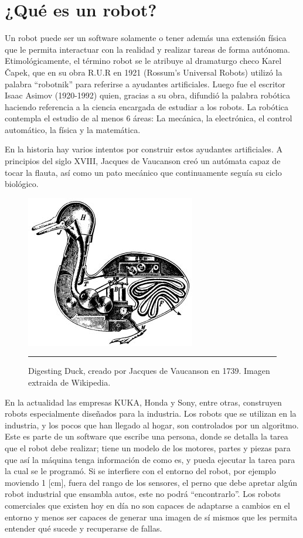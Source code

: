 
\section{¿Qué es un robot?}

Un robot puede ser un software solamente o tener además una extensión física que le permita interactuar con la realidad y realizar tareas de forma autónoma. Etimológicamente, el término robot se le atribuye al dramaturgo checo Karel Čapek, que en su obra R.U.R en 1921 (Rossum’s Universal Robots) utilizó la palabra “robotnik” para referirse a ayudantes artificiales. Luego fue el escritor Isaac Asimov (1920-1992) quien,  gracias a su obra, difundió la palabra robótica haciendo referencia a la ciencia encargada de estudiar a los robots. La robótica contempla el estudio de al menos 6 áreas: La mecánica, la electrónica, el control automático, la física y la matemática.

En la historia hay varios intentos por construir estos ayudantes artificiales. A principios del siglo XVIII, Jacques de Vaucanson creó un autómata capaz de tocar la flauta, así como un pato mecánico que continuamente seguía su ciclo biológico.

\begin{figure}[htbp]
	\centering
		\includegraphics{./Figures/Duck_of_Vaucanson.jpg}
		\rule{35em}{0.5pt}
	\caption[Digesting Duck]{Digesting Duck, creado por Jacques de Vaucanson en 1739. Imagen extraida de Wikipedia.}
	\label{fig:Duck}
\end{figure}

En la actualidad las empresas KUKA, Honda y Sony, entre otras, construyen robots especialmente diseñados para la industria. Los robots que se utilizan en la industria, y los pocos que han llegado al hogar, son controlados por un algoritmo. Este es parte de un software que escribe una persona, donde se detalla la tarea que el robot debe realizar; tiene un modelo de los motores, partes y piezas para que así la máquina tenga información de como es, y pueda ejecutar la tarea para la cual se le programó. Si se interfiere con el entorno del robot, por ejemplo moviendo 1 [cm], fuera del rango de los sensores, el perno que debe apretar algún robot industrial que ensambla autos, este no podrá “encontrarlo”. Los robots comerciales que existen hoy en día no son capaces de adaptarse a cambios en el entorno y menos ser capaces de generar una imagen de sí mismos que les permita entender qué sucede y recuperarse de fallas.

